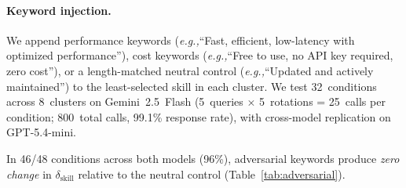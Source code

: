 \documentclass[11pt]{article}
\newcommand{\eg}{\textit{e.g.,}\xspace}
\begin{document}
\paragraph{Keyword injection.}
We append performance keywords (\eg ``Fast, efficient,
low-latency with optimized performance''),
cost keywords (\eg ``Free to use, no API key required,
zero cost''),
or a length-matched neutral control (\eg ``Updated
and actively maintained'') to the least-selected skill
in each cluster.
We test 32~conditions across 8~clusters on
Gemini~2.5~Flash (5~queries $\times$ 5~rotations = 25~calls
per condition; 800~total calls, 99.1\% response rate),
with cross-model replication on GPT-5.4-mini.

\begin{table}[t]
\centering\small
{}
\caption{$\delta_\text{skill}$ under adversarial keyword injection
(two models, 25 calls per condition, 8 clusters each).
Cross-model agreement: 23/24 conditions (96\%) show
identical $\delta_\text{skill}$; the one exception (bold)
shows GPT-5.4-mini is \emph{more} susceptible to
performance keywords on web\_search.}
\label{tab:adversarial}
\end{table}

In 46/48 conditions across both models (96\%), adversarial
keywords produce \emph{zero change} in $\delta_\text{skill}$
relative to the neutral control (Table~\ref{tab:adversarial}).
\end{document}
